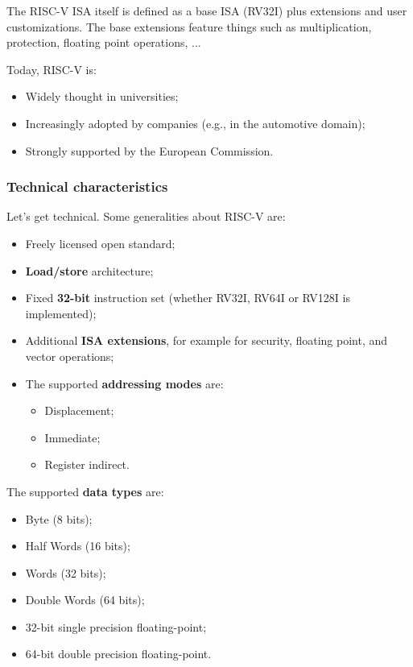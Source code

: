 \documentclass[a4paper,11pt]{article}
\begin{document}
The RISC-V ISA itself is defined as a base ISA (RV32I) plus extensions and user customizations.
The base extensions feature things such as multiplication, protection, floating point operations, ...

Today, RISC-V is:
\begin{itemize}
	\item Widely thought in universities;
	\item Increasingly adopted by companies (e.g., in the automotive domain);
	\item Strongly supported by the European Commission.
\end{itemize}

\subsubsection{Technical characteristics}

Let's get technical.
Some generalities about RISC-V are:
\begin{itemize}
	\item Freely licensed open standard;
	\item \textbf{Load/store} architecture;
	\item Fixed \textbf{32-bit} instruction set (whether RV32I, RV64I or RV128I is implemented);
	\item Additional \textbf{ISA extensions}, for example for security, floating point, and vector operations;
	\item The supported \textbf{addressing modes} are:
	      \begin{itemize}
		      \item Displacement;
		      \item Immediate;
		      \item Register indirect.
	      \end{itemize}
\end{itemize}

The supported \textbf{data types} are:
\begin{itemize}
	\item Byte (8 bits);
	\item Half Words (16 bits);
	\item Words (32 bits);
	\item Double Words (64 bits);
	\item 32-bit single precision floating-point;
	\item 64-bit double precision floating-point.
\end{itemize}
\end{document}

